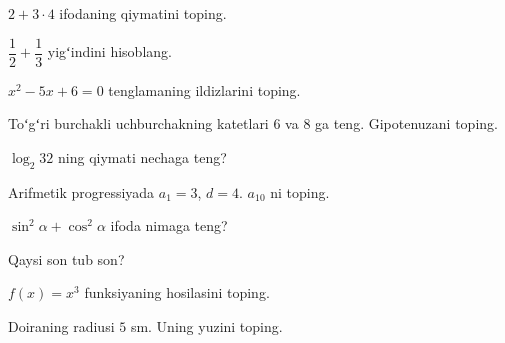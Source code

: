
\begin{savol}
  $2+3\cdot 4$ ifodaning qiymatini toping.
\end{savol}

\begin{savol}
  $\dfrac{1}{2}+\dfrac{1}{3}$ yigʻindini hisoblang.
\end{savol}

\begin{savol}
  $x^2-5x+6=0$ tenglamaning ildizlarini toping.
\end{savol}

\begin{savol}
  Toʻgʻri burchakli uchburchakning katetlari $6$ va $8$ ga teng. Gipotenuzani toping.
\end{savol}

\begin{savol}
  $\log_2 32$ ning qiymati nechaga teng?
\end{savol}

\begin{savol}
  Arifmetik progressiyada $a_1=3$, $d=4$. $a_{10}$ ni toping.
\end{savol}

\begin{savol}
  $\sin^2\alpha+\cos^2\alpha$ ifoda nimaga teng?
  \variant{$\sin 2\alpha$}
\end{savol}

\begin{savol}
  Qaysi son tub son?
\end{savol}

\begin{savol}
  $f(x)=x^3$ funksiyaning hosilasini toping.
\end{savol}

\begin{savol}
  Doiraning radiusi $5$ sm. Uning yuzini toping.
\end{savol}
